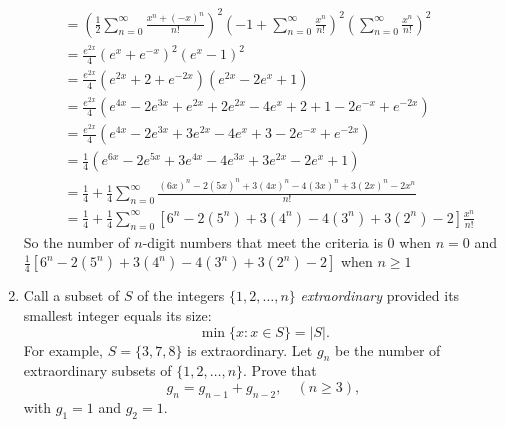 \documentclass{article}
\begin{document}
\begin{enumerate}
\begin{align*}
  &=\left(\frac{1}{2}\sum\limits_{n=0}^\infty{\frac{x^n+(-x)^n}{n!}}\right)^2\left(-1+\sum\limits_{n=0}^\infty{\frac{x^n}{n!}}\right)^2\left(\sum\limits_{n=0}^\infty{\frac{x^n}{n!}}\right)^2\\
  &=\frac{e^{2x}}{4}\left(e^x+e^{-x}\right)^2(e^x-1)^2\\
  &=\frac{e^{2x}}{4}\left(e^{2x}+2+e^{-2x}\right)(e^{2x}-2e^x+1)\\
  &=\frac{e^{2x}}{4}\left(e^{4x}-2e^{3x}+e^{2x}+2e^{2x}-4e^x+2+1-2e^{-x}+e^{-2x}\right)\\
  &=\frac{e^{2x}}{4}\left(e^{4x}-2e^{3x}+3e^{2x}-4e^x+3-2e^{-x}+e^{-2x}\right)\\
  &=\frac{1}{4}\left(e^{6x}-2e^{5x}+3e^{4x}-4e^{3x}+3e^{2x}-2e^{x}+1\right)\\
  &=\frac{1}{4}+\frac{1}{4}\sum\limits_{n=0}^\infty{\frac{(6x)^n-2(5x)^n+3(4x)^n-4(3x)^n+3(2x)^n-2x^n}{n!}}\\
  &=\frac{1}{4}+\frac{1}{4}\sum\limits_{n=0}^\infty{\left[6^n-2(5^n)+3(4^n)-4(3^n)+3(2^n)-2\right]\frac{x^n}{n!}}
\end{align*}
So the number of $n$-digit numbers that meet the criteria is 0 when $n=0$ and $\frac{1}{4}\left[6^n-2(5^n)+3(4^n)-4(3^n)+3(2^n)-2\right]$ when $n\ge1$
\setcounter{enumi}{49}
\item
Call a subset of $S$ of the integers $\{1,2,\dots,n\}$ \emph{extraordinary} provided its smallest integer equals its size:
\[\min\{x:x\in S\}=\lvert S\rvert.\]
For example, $S=\{3,7,8\}$ is extraordinary. Let $g_n$ be the number of extraordinary subsets of $\{1,2,\dots,n\}$. Prove that
\[g_n=g_{n-1}+g_{n-2},\quad(n\ge3),\]
with $g_1=1$ and $g_2=1$.

\end{enumerate}
\end{document}
